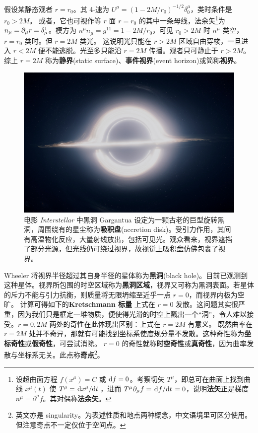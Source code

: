 假设某静态观者 $r=r_0$。其 4-速为 $U^\mu=(1-2M/r_0)^{-1/2}\delta^\mu_0$，类时条件是 $r_0>2 M$。
或者，它也可视作等 $r$ 面 $r=r_0$ 的其中一条母线，法余矢\footnote{设超曲面方程 $f(x^\mu)=C$ 或 $\dd f=0$。考察切矢 $T^\mu$，即总可在曲面上找到曲线 $x^\mu(t)$ 使 $T^\mu=\dv*{x^\mu}{t}$，进而 $T^\mu\partial_\mu f=\dv*{f}{t}=0$，说明\textbf{法矢}正是梯度 $n^\mu=\partial^\mu f$。其对偶称\textbf{法余矢}。}为 $n_\mu=\partial_\mu r=\delta^1_\mu$。模方为 $n^\mu n_\mu=g^{11}=1-2M/r_0$，可见 $r_0>2M$ 时 $n^\mu$ 类空，$r=r_0$ 类时。但 $r=2M$ 类光。
这说明光只能在 $r>2M$ 区域自由穿梭，一旦进入 $r<2M$ 便不能逃脱。光至多只能沿 $r=2M$ 传播。观者只可静止于 $r>2M$。
综上 $r=2M$ 称为\textbf{静界}(static surface)、\textbf{事件视界}(event horizon)或简称\textbf{视界}。
\begin{figure}[h!]
    \centering
    \includegraphics[width=.7\textwidth]{fig/chpt01/blackhole.jpg}
    \caption{\small 电影 \textit{Interstellar} 中黑洞 Gargantua 设定为一颗古老的巨型旋转黑洞，周围绕有的星尘称为\textbf{吸积盘}(accretion disk)。受引力作用，其间有高温物化反应，大量射线放出，包括可见光。观众看来，视界遮挡了部分光源，但光线仍可绕过视界，故视觉上吸积盘仿佛包裹了视界。}
\end{figure}

Wheeler 将视界半径超过其自身半径的星体称为\textbf{黑洞}(black hole)。目前已观测到这种星体。视界所包围的时空区域称为\textbf{黑洞区域}，视界又可称为黑洞表面。若星体的斥力不能与引力抗衡，则质量将无限坍缩至近乎一点 $r=0$，而视界内极为空旷。
计算可得如下的\textbf{Kretschmann 标量}
上式在 $r=0$ 发散。这问题其实很严重，因为我们只是框定一堆物质，便使得光滑的时空上戳出一个“洞”，令人难以接受。$r=0,2M$ 两处的奇性在此体现出区别：上式在 $r=2M$ 有意义。
既然曲率在 $r=2M$ 处并不奇异，那就有可能找到坐标系使度规分量不发散。这种奇性称为\textbf{坐标奇性}或\textbf{假奇性}，可尝试消除。
$r=0$ 的奇性就称\textbf{时空奇性}或\textbf{真奇性}，因为曲率发散与坐标系无关。此点称\textbf{奇点}\footnote{英文亦是 singularity。为表述性质和地点两种概念，中文语境里可区分使用。但注意奇点不一定仅位于空间点。}。

